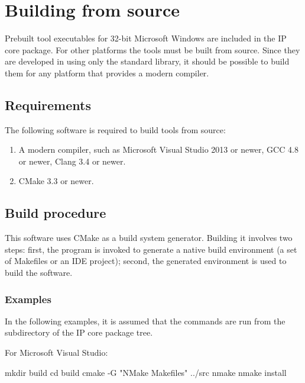 \documentclass[a4paper,12pt,twoside,extrafontsizes]{memoir}
\begin{document}
\section{Building from source}
\label{sec:buildfromsource}

Prebuilt tool executables for 32-bit Microsoft\textregistered{} Windows\textregistered{} are included in the \lxp{} IP core package. For other platforms the tools must be built from source. Since they are developed in \cplusplus{} using only the standard library, it should be possible to build them for any platform that provides a modern \cplusplus{} compiler.

\subsection{Requirements}

The following software is required to build \lxp{} tools from source:

\begin{enumerate}
	\item A modern \cplusplus{} compiler, such as Microsoft\textregistered{} Visual Studio\textregistered{} 2013 or newer, GCC 4.8 or newer, Clang 3.4 or newer.
	\item CMake 3.3 or newer.
\end{enumerate}

\subsection{Build procedure}

This software uses CMake as a build system generator. Building it involves two steps: first, the  program is invoked to generate a native build environment (a set of Makefiles or an IDE project); second, the generated environment is used to build the software.

\subsubsection{Examples}

In the following examples, it is assumed that the commands are run from the  subdirectory of the \lxp{} IP core package tree.

For Microsoft\textregistered{} Visual Studio\textregistered{}:

\begin{codepar}
    mkdir build
    cd build
    cmake -G "NMake Makefiles" ../src
    nmake
    nmake install
\end{codepar}
\end{document}
